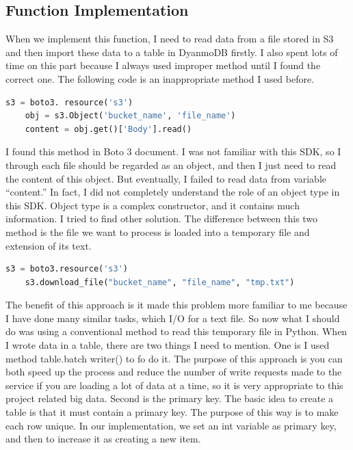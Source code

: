 \subsection{Function Implementation}
When we implement this function,  I need to read data from a file stored in S3 and then import these data to a table in DyanmoDB firstly. I also spent lots of time on this part because I always used improper method until I found the correct one.  The following code is an inappropriate method I used before.

\begin{lstlisting}[language=Python, caption=inappropriate method to access S3 and read data]
	s3 = boto3. resource('s3')
	obj = s3.Object('bucket_name', 'file_name')
	content = obj.get()['Body'].read()  
\end{lstlisting}

\noindent I found this method in Boto 3 document. I was not familiar with this SDK, so I through each file should be regarded as an object, and then I just need to read the content of this object. But eventually, I failed to read data from variable “content.”  In fact, I did not completely understand the role of an object type in this SDK. Object type is a complex constructor, and it contains much information. I tried to find other solution. The difference between this two method is the file we want to process is loaded into a temporary file and extension of its text.

\begin{lstlisting}[language=Python, caption=appropriate method to access S3 and read data]
	s3 = boto3.resource('s3')
	s3.download_file("bucket_name", "file_name", "tmp.txt") 
\end{lstlisting}

\noindent The benefit of this approach is it made this problem more familiar to me because I have done many similar tasks, which I/O for a text file. So now what I should do was using a conventional method to read this temporary file in Python. When I wrote data in a table, there are two things I need to mention. One is I used method table.batch writer() to fo do it. The purpose of this approach is you can both speed up the process and reduce the number of write requests made to the service if you are loading a lot of data at a time, so it is very appropriate to this project related big data. Second is the primary key. The basic idea to create a table is that it must contain a primary key. The purpose of this way is to make each row unique. In our implementation, we set an int variable as primary key, and then to increase it as creating a new item.


